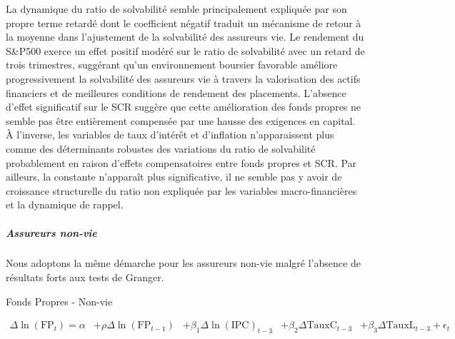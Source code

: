 \documentclass[
]{article}
\begin{document}
La dynamique du ratio de solvabilité semble principalement expliquée par
son propre terme retardé dont le coefficient négatif traduit un
mécanisme de retour à la moyenne dans l'ajustement de la solvabilité des
assureurs vie. Le rendement du S\&P500 exerce un effet positif modéré
sur le ratio de solvabilité avec un retard de trois trimestres,
suggérant qu'un environnement boursier favorable améliore
progressivement la solvabilité des assureurs vie à travers la
valorisation des actifs financiers et de meilleures conditions de
rendement des placements. L'absence d'effet significatif sur le SCR
suggère que cette amélioration des fonds propres ne semble pas être
entièrement compensée par une hausse des exigences en capital. À
l'inverse, les variables de taux d'intérêt et d'inflation n'apparaissent
plus comme des déterminants robustes des variations du ratio de
solvabilité probablement en raison d'effets compensatoires entre fonds
propres et SCR. Par ailleurs, la constante n'apparaît plus
significative, il ne semble pas y avoir de croissance structurelle du
ratio non expliquée par les variables macro-financières et la dynamique
de rappel.

\subparagraph{\texorpdfstring{Assureurs non-vie\\
}{Assureurs non-vie }}\label{assureurs-non-vie}

\hfill\break
Nous adoptons la même démarche pour les assureurs non-vie malgré
l'absence de résultats forts aux tests de Granger.

Fonds Propres - Non-vie

\begin{equation}
\begin{aligned}
\Delta \ln(\text{FP}_t) = \alpha & + \rho \Delta \ln(\text{FP}_{t-1}) 
& + \beta_1 \Delta \ln(\text{IPC})_{t-3}
& + \beta_2 \Delta \text{TauxC}_{t-3}
& + \beta_3 \Delta \text{TauxL}_{t-3} + \epsilon_t
\end{aligned}
\end{equation}
\end{document}
